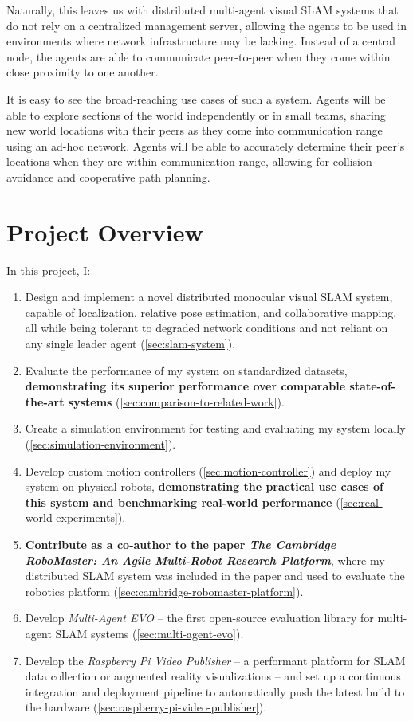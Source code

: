 Naturally, this leaves us with distributed multi-agent visual SLAM systems that do not rely on a centralized management server, allowing the agents to be used in environments where network infrastructure may be lacking. Instead of a central node, the agents are able to communicate peer-to-peer when they come within close proximity to one another.

It is easy to see the broad-reaching use cases of such a system. Agents will be able to explore sections of the world independently or in small teams, sharing new world locations with their peers as they come into communication range using an ad-hoc network. Agents will be able to accurately determine their peer's locations when they are within communication range, allowing for collision avoidance and cooperative path planning.

\section{Project Overview}
\label{sec:project-overview}
In this project, I: \noparskip
{
    \begin{enumerate}
        \item Design and implement a novel distributed monocular visual SLAM system, capable of localization, relative pose estimation, and collaborative mapping, all while being tolerant to degraded network conditions and not reliant on any single leader agent (\autoref{sec:slam-system}).
        \item Evaluate the performance of my system on standardized datasets, \textbf{demonstrating its superior performance over comparable state-of-the-art systems} (\autoref{sec:comparison-to-related-work}).
        \item Create a simulation environment for testing and evaluating my system locally (\autoref{sec:simulation-environment}).
        \item Develop custom motion controllers (\autoref{sec:motion-controller}) and deploy my system on physical robots, \textbf{demonstrating the practical use cases of this system and benchmarking real-world performance} (\autoref{sec:real-world-experiments}).
        \item \textbf{Contribute as a co-author to the paper \textit{The Cambridge RoboMaster: An Agile Multi-Robot Research Platform}}, where my distributed SLAM system was included in the paper and used to evaluate the robotics platform (\autoref{sec:cambridge-robomaster-platform}).
        \item Develop \textit{Multi-Agent EVO} – the first open-source evaluation library for multi-agent SLAM systems (\autoref{sec:multi-agent-evo}).
        \item Develop the \textit{Raspberry Pi Video Publisher} – a performant platform for SLAM data collection or augmented reality visualizations – and set up a continuous integration and deployment pipeline to automatically push the latest build to the hardware (\autoref{sec:raspberry-pi-video-publisher}).
    \end{enumerate}
}

